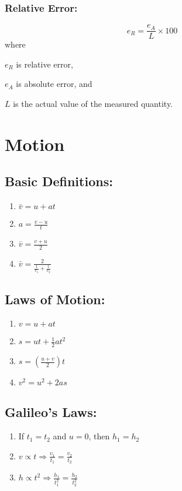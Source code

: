 \documentclass[a4paper]{report}
\begin{document}
        \subsection{Relative Error: }
            \begin{equation}
                e_R = \frac{e_A}{L} \times 100%
            \end{equation}
            where
            \begin{description}
                \item $e_R$ is relative error,
                \item $e_A$ is absolute error, and
                \item $L$ is the actual value of the measured quantity.
            \end{description}


\chapter{Motion}
    \section{Basic Definitions: }
        \begin{enumerate}
            \item $ \bar{v} = u + at $
            \item $ a = \frac{v - u}{t} $
            \item $ \bar{v} = \frac{v + u}{2} $
            \item $ \bar{v} = \frac{2}{\frac{1}{v_1} + \frac{1}{v_2}} $
        \end{enumerate}
    \section{Laws of Motion: }
        \begin{enumerate}
            \item $ v = u + at $
            \item $ s = ut + \frac{1}{2}at^2 $
            \item $ s = ( \frac{u + v}{2} ) t $
            \item $ v^2 = u^2 + 2as $
        \end{enumerate}
    \section{Galileo's Laws: }
            \begin{enumerate}
                \item If \(t_{1} = t_{2} \) and \(u = 0 \), then \( h_{1} = h_{2} \)
                \item $ v \propto t \Rightarrow \frac{v_1}{t_1} = \frac{v_2}{t_2} $
                \item $ h \propto t^2 \Rightarrow \frac{h_1}{t_1^2} = \frac{h_2}{t_2^2} $
            \end{enumerate}
\end{document}
